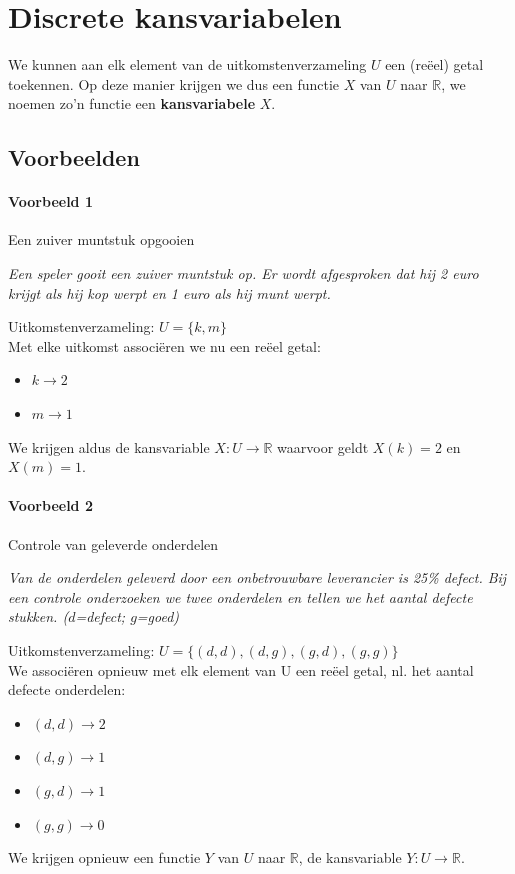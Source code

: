 \documentclass[a4paper,12pt, twoside]{article}
\begin{document}
\thispagestyle{empty}
\newpage
\thispagestyle{empty}
{
\small
\singlespacing
\tableofcontents
}
\newpage
\clearpage
{}
\pagestyle{fancy}
\lhead{}

\fancyhead[RE,LO]{}

\section{Discrete kansvariabelen}

We kunnen aan elk element van de uitkomstenverzameling $U$ een (reëel) getal toekennen. Op deze manier krijgen we dus een functie $X$ van $U$ naar $\mathbb{R}$, we noemen zo'n functie een {\bf kansvariabele} $X$.

\subsection{Voorbeelden}

\paragraph*{Voorbeeld 1} Een zuiver muntstuk opgooien

{\em Een speler gooit een zuiver muntstuk op. Er wordt afgesproken dat hij 2 euro krijgt als hij kop werpt en 1 euro als hij munt werpt.}

Uitkomstenverzameling: $U=\{k, m\}$\\
Met elke uitkomst associëren we nu een reëel getal:
\begin{itemize}
  \item $k \to 2$
  \item $m \to 1$
\end{itemize}
We krijgen aldus de kansvariable $X:U\to\mathbb{R}$ waarvoor geldt $X(k)=2$ en $X(m)=1$.

\paragraph*{Voorbeeld 2} Controle van geleverde onderdelen

{\em Van de onderdelen geleverd door een onbetrouwbare leverancier is 25\% defect. Bij een controle onderzoeken we twee onderdelen en tellen we het aantal defecte stukken. ($d$=defect; $g$=goed)}

Uitkomstenverzameling: $U=\{(d,d), (d,g), (g,d), (g,g)\}$\\
We associëren opnieuw met elk element van U een reëel getal, nl. het aantal defecte onderdelen:
\begin{itemize}
  \item $(d,d) \to 2$
  \item $(d,g) \to 1$
  \item $(g,d) \to 1$
  \item $(g,g) \to 0$
\end{itemize}
We krijgen opnieuw een functie $Y$ van $U$ naar $\mathbb{R}$, de kansvariable $Y:U\to\mathbb{R}$.
\end{document}
